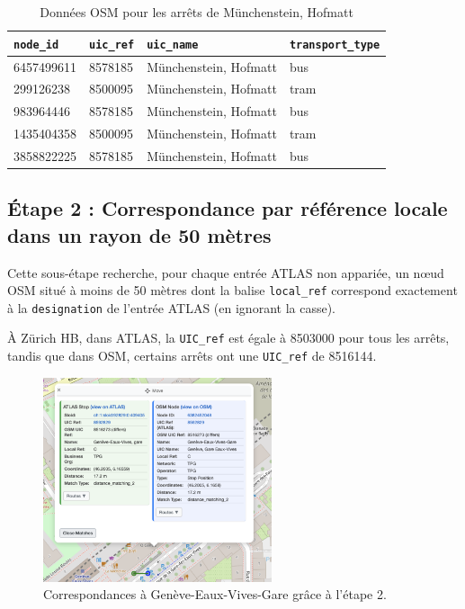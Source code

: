 \begin{table}[h]
\caption[Données OSM – Münchenstein, Hofmatt]{Données OSM pour les arrêts de Münchenstein, Hofmatt}
\label{tab:osm_data}
\centering
\begin{tabular}{l l l l}
\toprule
\texttt{node\_id} & \texttt{uic\_ref} & \texttt{uic\_name} & \texttt{transport\_type} \\
\midrule
6457499611 & 8578185 & Münchenstein, Hofmatt & bus \\
299126238 & 8500095 & Münchenstein, Hofmatt & tram \\
983964446 & 8578185 & Münchenstein, Hofmatt & bus \\
1435404358 & 8500095 & Münchenstein, Hofmatt & tram \\
3858822225 & 8578185 & Münchenstein, Hofmatt & bus \\
\bottomrule
\end{tabular}
\end{table}

\FloatBarrier

\subsection{Étape 2 : Correspondance par référence locale dans un rayon de 50 mètres}
Cette sous-étape recherche, pour chaque entrée ATLAS non appariée, un nœud OSM situé à moins de 50 mètres dont la balise \texttt{local\_ref} correspond exactement à la \texttt{designation} de l’entrée ATLAS (en ignorant la casse).

À Zürich HB, dans ATLAS, la \texttt{UIC\_ref} est égale à 8503000 pour tous les arrêts, tandis que dans OSM, certains arrêts ont une \texttt{UIC\_ref} de 8516144. 

\begin{figure}[h]
    \centering
    \includegraphics[height=6cm]{../figures/correspondances/distance_2.png}
    \caption[Correspondances distance étape 2]{Correspondances à Genève-Eaux-Vives-Gare grâce à l'étape 2.}
    \label{fig:distance_2}
\end{figure}

